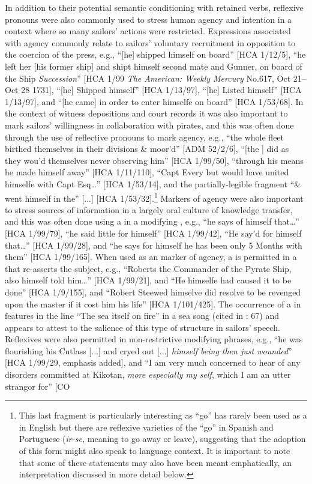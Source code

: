 In addition to their potential semantic conditioning with retained  verbs, reflexive pronouns were also commonly used to stress human agency and intention in a context where so many sailors’ actions were restricted. Expressions associated with  agency commonly relate to sailors’ voluntary recruitment in opposition to the coercion of the press, e.g., “[he] shipped himself on board” [HCA 1/12/5], “he left her [his former ship] and shipt himself second mate and Gunner, on board of the Ship \textit{Succession}” [HCA 1/99 \textit{The American: Weekly Mercury} No.617, Oct 21–Oct 28 1731], “[he] Shipped himself” [HCA 1/13/97], “[he] Listed himself” [HCA 1/13/97], and “[he came] in order to enter himselfe on board” [HCA 1/53/68]. In the context of witness depositions and court records it was also important to mark sailors’ willingness in collaboration with pirates, and this was often done through the use of reflective pronouns to mark agency, e.g., “the whole fleet birthed themselves in their divisions \& moor’d” [ADM 52/2/6], “[the ] did as they wou’d themselves never observing him” [HCA 1/99/50], “through his means he made himself away” [HCA 1/11/110], “Capt Every but would have united himselfe with Capt Esq…” [HCA 1/53/14], and the partially-legible fragment “\& went himself in the” [...] [HCA 1/53/32].\footnote{This last fragment is particularly interesting as “go” has rarely been used as a  in English but there are reflexive varieties of the  “go” in Spanish and Portuguese (\textit{ir-se,} meaning to go away or leave), suggesting that the adoption of this form might also speak to language context. It is important to note that some of these statements may also have been meant emphatically, an interpretation discussed in more detail below.}  Markers of agency were also important to stress sources of information in a largely oral culture of knowledge transfer, and this was often done using a  in a modifying , e.g., “he says of himself that…” [HCA 1/99/79], “he said little for himself” [HCA 1/99/42], “He say’d for himself that…” [HCA 1/99/28], and “he says for himself he has been only 5 Months with them” [HCA 1/99/165]. When used as an  marker of agency, a  is permitted in a  that re-asserts the  subject, e.g., “Roberts the Commander of the Pyrate Ship, also himself told him…” [HCA 1/99/21], and “He himselfe had caused it to be done” [HCA 1/9/155], and “Robert Steewed himselve did resolve to be revenged upon the master if it cost him his life” [HCA 1/101/425]. The occurrence of a  in  features in the line “The sea itself on fire” in a  sea song (cited in \citealt{Palmer1986}: 67) and appears to attest to the salience of this type of structure in sailors’ speech. Reflexives were also permitted in non-restrictive modifying phrases, e.g., “he was flourishing his Cutlass [...] and cryed out [...] \textit{himself being then just wounded}” [HCA 1/99/29, emphasis added], and “I am very much concerned to hear of any disorders committed at Kikotan, \textit{more especially my self}, which I am an utter strangor for” [CO 